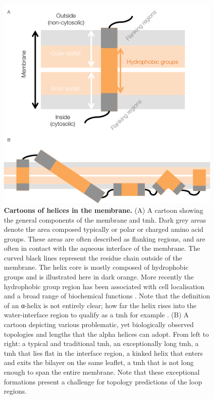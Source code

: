 \documentclass[12pt,PhD,twoside]{muthesis}
\begin{document}
\begin{figure}[h]
\centering
\includegraphics[width=1\textwidth]{Helix_anatomy}
\caption{\textbf{Cartoons of helices in the membrane.}
(A) A cartoon showing the general components of the membrane and \gls{tmh}. Dark grey areas denote the area composed typically or polar or charged amino acid groups. These areas are often described as flanking regions, and are often in contact with the aqueous interface of the membrane. The curved black lines represent the residue chain outside of the membrane. The helix core is mostly composed of hydrophobic groups and is illustrated here in dark orange. More recently the hydrophobic group region has been associated with cell localisation and a broad range of biochemical functions \cite{Junne2010, Wong2012}. Note that the definition of an α-helix is not entirely clear; how far the helix rises into the water-interface region to qualify as a \gls{tmh} for example \cite{VonHeijne2006}. (B) A cartoon depicting various problematic, yet biologically observed topologies and lengths that the alpha helices can adopt. From left to right: a typical and traditional \gls{tmh}, an exceptionally long \gls{tmh}, a \gls{tmh} that lies flat in the interface region, a kinked helix that enters and exits the bilayer on the same leaflet, a \gls{tmh} that is not long enough to span the entire membrane. Note that these exceptional formations present a challenge for topology predictions of the loop regions.}
\label{fig:helixcartoon1}
\end{figure}
\end{document}
